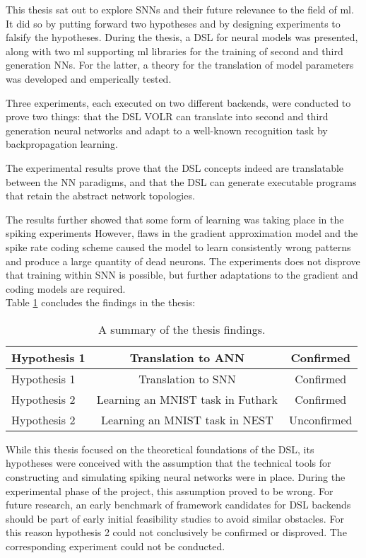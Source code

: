 \documentclass[report.tex]{subfiles}
\begin{document}
This thesis sat out to explore \glspl{SNN} and their future relevance to the field of
\gls{ml}.
It did so by putting forward two hypotheses and by designing experiments to
falsify the hypotheses.
During the thesis, a \gls{DSL} for neural models was presented, along with two \gls{ml}
supporting \gls{ml} libraries for the training of second and third generation
\glspl{NN}. 
For the latter, a theory for the translation of model parameters was developed
and emperically tested.

Three experiments, each executed on two different backends, were conducted to
prove two things: that the \gls{DSL} VOLR can translate into second and third
generation neural networks and adapt to a well-known recognition task by
backpropagation learning.

The experimental results prove that the \gls{DSL} concepts indeed are
translatable between the \gls{NN} paradigms, and that the \gls{DSL} can generate
executable programs that retain the abstract network topologies.

The results further showed that some form of learning was taking place in the
spiking experiments
However, flaws in the gradient approximation model and the spike rate coding scheme
caused the model to learn consistently wrong patterns and produce a large
quantity of dead neurons.
The experiments does not disprove that training within \gls{SNN} is possible,
but further adaptations to the gradient and coding models are required.
\\[0.1cm]

Table \ref{tab:findings} concludes the findings in the thesis:

\def\arraystretch{1.5}
\begin{table}
  \centering
  \begin{tabular}{l c c}
     Hypothesis 1 & Translation to \gls{ANN} & Confirmed \\ \hline
     Hypothesis 1 & Translation to \gls{SNN} & Confirmed \\ \hline
     Hypothesis 2 & Learning an MNIST task in Futhark & Confirmed \\ \hline
     Hypothesis 2 & Learning an MNIST task in NEST & Unconfirmed \\ \hline
  \end{tabular}
  \caption{A summary of the thesis findings.}
  \label{tab:findings}
\end{table}

While this thesis focused on the theoretical foundations of the DSL, its hypotheses were conceived with the assumption that the
technical tools for constructing and simulating spiking neural networks were in place.
During the experimental phase of the project, this assumption proved to be wrong.
For future research, an early benchmark of framework candidates for DSL backends should be part of early initial feasibility studies to avoid similar obstacles. For this reason hypothesis 2 could not conclusively be confirmed or disproved. The corresponding experiment could not be conducted.
\end{document}
